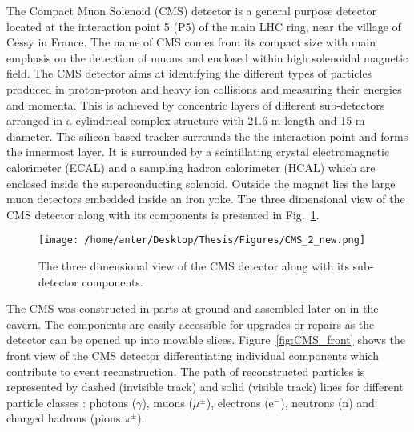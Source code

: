 The Compact Muon Solenoid (CMS) detector is a general purpose detector located at the interaction point 5 (P5) of the main LHC ring, near the village of Cessy in France. The name of CMS comes from its compact size with main emphasis on the detection of muons and enclosed within high solenoidal magnetic field. The CMS detector aims at identifying the different types of particles produced in proton-proton and heavy ion collisions and measuring their energies and momenta. This is achieved by concentric layers of different sub-detectors arranged in a cylindrical complex structure with 21.6 m length and 15 m diameter. The silicon-based tracker surrounds the the interaction point and forms the innermost layer. It is surrounded by a scintillating crystal electromagnetic calorimeter (ECAL) and a sampling hadron calorimeter (HCAL) which are enclosed inside the superconducting solenoid. Outside the magnet lies the large muon detectors embedded inside an iron yoke. The three dimensional view of the CMS detector along with its components is presented in Fig.~\ref{fig:CMS}.\begin{figure}[!h]
\begin{center}
\vspace{2mm}
\hspace*{-6mm}
\texttt{[image: /home/anter/Desktop/Thesis/Figures/CMS\_2\_new.png]}\\
\vspace*{5mm}
\caption[CMS]{The three dimensional view of the CMS detector along with its sub-detector components\footnotemark.}
\label{fig:CMS}
\end{center}
\end{figure} The CMS was constructed in parts at ground and assembled later on in the cavern. The components are easily accessible for upgrades or repairs as the detector can be opened up into movable slices. Figure~\ref{fig:CMS_front} shows the front view of the CMS detector differentiating individual components which contribute to event reconstruction. The path of reconstructed particles is represented by dashed (invisible track) and solid (visible track) lines for different particle classes : photons ($\gamma$), muons ($\mu^{\pm}$), electrons (e$^{-}$), neutrons (n) and charged hadrons (pions $\pi^{\pm}$).

